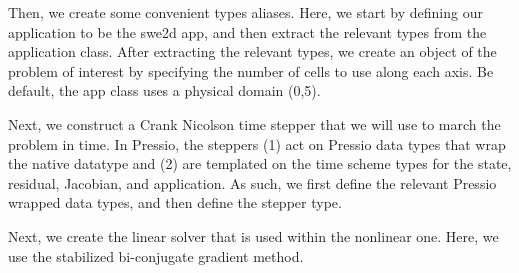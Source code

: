 Then, we create some convenient types aliases. Here, we start by defining our application to be the swe2d app, and then extract the relevant types from the application class. After extracting the relevant types, we create an object of the problem of interest by specifying the number of cells to use along each axis. Be default, the app class uses a physical domain (0,5). 
\begin{DoxyCode}{0}
\DoxyCodeLine{}
\DoxyCodeLine{\textcolor{comment}{// create FOM object/problem: contains grid, how to compute operators, etc}}
\end{DoxyCode}


Next, we construct a Crank Nicolson time stepper that we will use to march the problem in time. In Pressio, the steppers (1) act on Pressio data types that wrap the native datatype and (2) are templated on the time scheme types for the state, residual, Jacobian, and application. As such, we first define the relevant Pressio wrapped data types, and then define the stepper type. 
\begin{DoxyCode}{0}
\DoxyCodeLine{}
\end{DoxyCode}


Next, we create the linear solver that is used within the nonlinear one. Here, we use the stabilized bi-\/conjugate gradient method. 
\begin{DoxyCode}{0}
\DoxyCodeLine{\textcolor{comment}{// linear solver}}
\end{DoxyCode}


